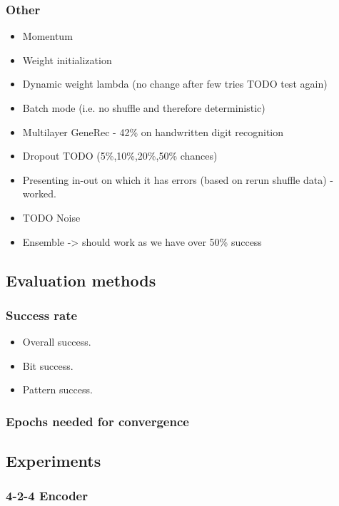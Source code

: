 \subsubsection{Other} 
\begin{itemize} 
\item Momentum
\item Weight initialization 
\item Dynamic weight lambda (no change after few tries TODO test again) 
\item Batch mode (i.e. no shuffle and therefore deterministic)
\item Multilayer GeneRec - 42\% on handwritten digit recognition 
\item Dropout TODO (5\%,10\%,20\%,50\% chances)
\item Presenting in-out on which it has errors (based on rerun shuffle data) - worked. 
\item TODO Noise 
\item Ensemble -> should work as we have over 50\% success
\end{itemize} 

\subsection{Evaluation methods} 

\subsubsection{Success rate} 

\begin{itemize}
\item Overall success. 
\item Bit success. 
\item Pattern success. 
\end{itemize} 

\subsubsection{Epochs needed for convergence} 



\subsection{Experiments}  

\subsubsection{4-2-4 Encoder} 

